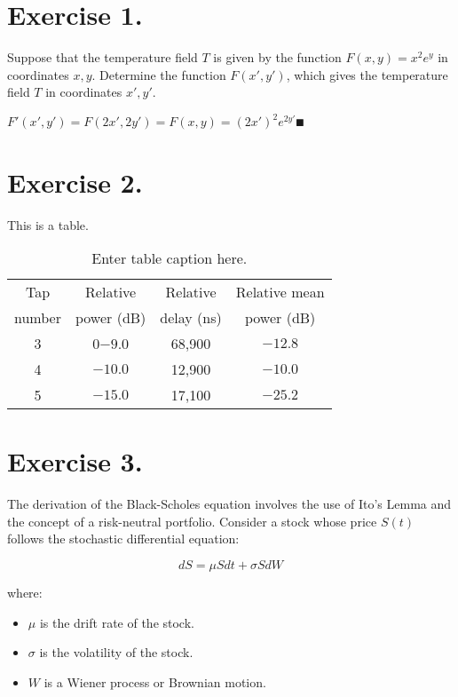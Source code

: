 \documentclass[../main.tex]{subfiles}
\begin{document}
\section{Exercise 1.}
Suppose that the temperature field $T$ is given by the function $F(x,y)=x^2e^y$ in coordinates $x, y$. Determine the function $F(x',y')$, which gives the temperature field $T$ in coordinates $x',y'$.

\sol

$F'(x',y')=F(2x',2y')=F(x,y)=(2x')^2e^{2y'}\QED$

\section{Exercise 2.}

This is a table.

\begin{table}
\caption{Enter table caption here.}
\begin{center}

\begin{tabular}{@{}cccc@{}}
\toprule
Tap     &Relative   &Relative   &Relative mean\\
number  &power (dB) &delay (ns) &power (dB)\\
\midrule
3 &0$-9.0$  &68,900\footnotemark[1] &$-12.8$\\
4 &$-10.0$ &12,900\footnotemark[2] &$-10.0$\\
5 &$-15.0$ &17,100 &$-25.2$\\
\bottomrule
\end{tabular}
\end{center}
\end{table}

\section{Exercise 3.}
The derivation of the Black-Scholes equation involves the use of Ito's Lemma and the concept of a risk-neutral portfolio. Consider a stock whose price \( S(t) \) follows the stochastic differential equation:

\begin{equation}
    dS = \mu S dt + \sigma S dW
\end{equation}

where:
\begin{itemize}
    \item \( \mu \) is the drift rate of the stock.
    \item \( \sigma \) is the volatility of the stock.
    \item \( W \) is a Wiener process or Brownian motion.
\end{itemize}

\end{document}
